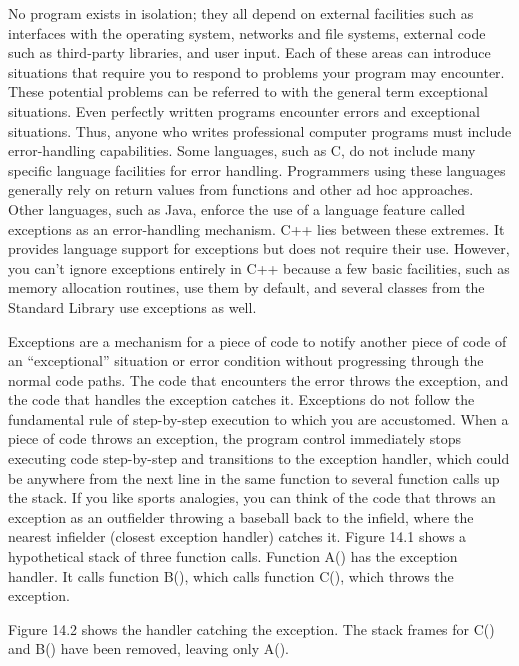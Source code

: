 
No program exists in isolation; they all depend on external facilities such as interfaces with the operating system, networks and file systems, external code such as third-party libraries, and user input. Each of these areas can introduce situations that require you to respond to problems your program may encounter. These potential problems can be referred to with the general term exceptional situations. Even perfectly written programs encounter errors and exceptional situations. Thus, anyone who writes professional computer programs must include error-handling capabilities. Some languages, such as C, do not include many specific language facilities for error handling. Programmers using these languages generally rely on return values from functions and other ad hoc approaches. Other languages, such as Java, enforce the use of a language feature called exceptions as an error-handling mechanism. C++ lies between these extremes. It provides language support for exceptions but does not require their use. However, you can’t ignore exceptions entirely in C++ because a few basic facilities, such as memory allocation routines, use them by default, and several classes from the Standard Library use exceptions as well.


Exceptions are a mechanism for a piece of code to notify another piece of code of an “exceptional” situation or error condition without progressing through the normal code paths. The code that encounters the error throws the exception, and the code that handles the exception catches it. Exceptions do not follow the fundamental rule of step-by-step execution to which you are accustomed. When a piece of code throws an exception, the program control immediately stops executing code step-by-step and transitions to the exception handler, which could be anywhere from the next line in the same function to several function calls up the stack. If you like sports analogies, you can think of the code that throws an exception as an outfielder throwing a baseball back to the infield, where the nearest infielder (closest exception handler) catches it. Figure 14.1 shows a hypothetical stack of three function calls. Function A() has the exception handler. It calls function B(), which calls function C(), which throws the exception.


Figure 14.2 shows the handler catching the exception. The stack frames for C() and B() have been removed, leaving only A().

